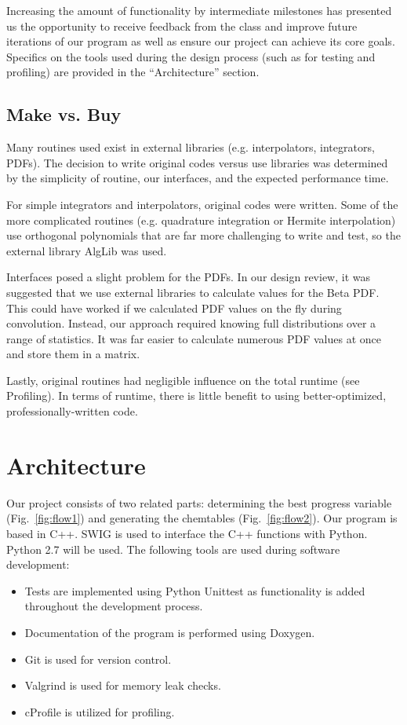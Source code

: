\documentclass[11pt]{article}
\begin{document}
Increasing the amount of functionality by intermediate milestones has
presented us the opportunity to receive feedback from the class and
improve future iterations of our program as well as ensure our project
can achieve its core goals. Specifics on the tools used during the
design process (such as for testing and profiling) are provided in the
“Architecture” section.

\subsection{Make vs. Buy}
Many routines used exist in external libraries (e.g. interpolators,
integrators, PDFs). The decision to write original codes versus use
libraries was determined by the simplicity of routine, our interfaces,
and the expected performance time.

For simple integrators and interpolators, original codes were
written. Some of the more complicated routines (e.g. quadrature
integration or Hermite interpolation) use orthogonal polynomials that
are far more challenging to write and test, so the external library
AlgLib was used.

Interfaces posed a slight problem for the PDFs. In our design review,
it was suggested that we use external libraries to calculate values
for the Beta PDF. This could have worked if we calculated PDF values
on the fly during convolution. Instead, our approach required knowing
full distributions over a range of statistics. It was far easier to
calculate numerous PDF values at once and store them in a matrix.

Lastly, original routines had negligible influence on the total
runtime (see Profiling). In terms of runtime, there is little benefit
to using better-optimized, professionally-written code.
 
\section{Architecture}
Our project consists of two related parts: determining the best
progress variable (Fig.~\ref{fig:flow1}) and generating the chemtables
(Fig.~\ref{fig:flow2}). Our program is based in C++. SWIG is used to
interface the C++ functions with Python. Python 2.7 will be used. The
following tools are used during software development:

\begin{itemize}
\item Tests are implemented using Python Unittest as functionality is
  added throughout the development process.
\item Documentation of the program is performed using Doxygen.
\item Git is used for version control.
\item Valgrind is used for memory leak checks.
\item cProfile is utilized for profiling.
\end{itemize}
\end{document}
